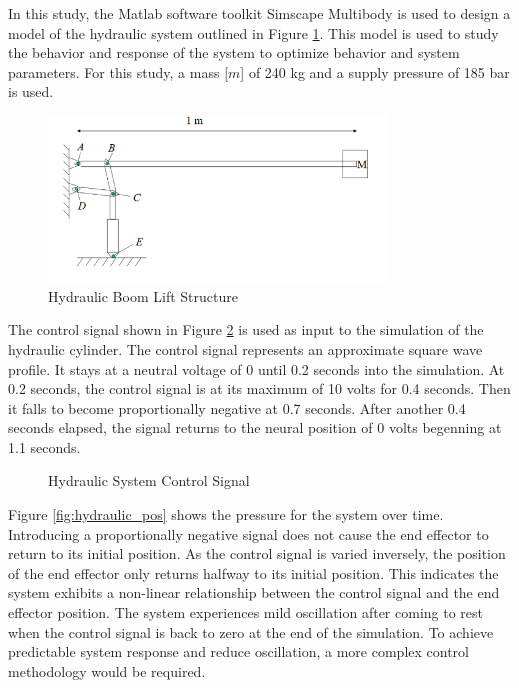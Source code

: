 In this study, the Matlab software toolkit Simscape Multibody is used to design a model of the hydraulic system outlined in Figure \ref{fig:boom_structure}. This model is used to study the behavior and response of the system to optimize behavior and system parameters. For this study, a mass [$m$] of 240 kg and a supply pressure of 185 bar is used.

\begin{figure}[H]
    \includegraphics[width=0.8\textwidth]{1_hydraulic_sim/BoomStructure.PNG}
    \caption{Hydraulic Boom Lift Structure}
    \label{fig:boom_structure}
\end{figure}


The control signal shown in Figure \ref{fig:hydraulic_cs} is used as input to the simulation of the hydraulic cylinder. The control signal represents an approximate square wave profile. It stays at a neutral voltage of 0 until 0.2 seconds into the simulation. At 0.2 seconds, the control signal is at its maximum of 10 volts for 0.4 seconds. Then it falls to become proportionally negative at 0.7 seconds. After another 0.4 seconds elapsed, the signal returns to the neural position of 0 volts begenning at 1.1 seconds.

\begin{figure}[H]
    
    \caption{Hydraulic System Control Signal}
    \label{fig:hydraulic_cs}
\end{figure}

Figure \ref{fig:hydraulic_pos} shows the pressure for the system over time. Introducing a proportionally negative signal does not cause the end effector to return to its initial position. As the control signal is varied inversely, the position of the end effector only returns halfway to its initial position. This indicates the system exhibits a non-linear relationship between the control signal and the end effector position. The system experiences mild oscillation after coming to rest when the control signal is back to zero at the end of the simulation. To achieve predictable system response and reduce oscillation, a more complex control methodology would be required.

